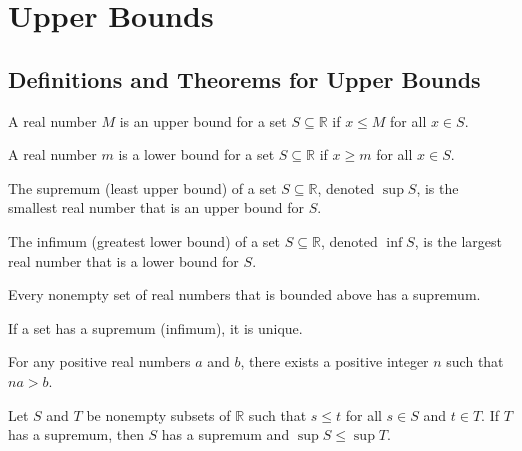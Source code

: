 \section{Upper Bounds}

\subsection*{Definitions and Theorems for Upper Bounds}

\begin{definition}
A real number $M$ is an upper bound for a set $S \subseteq \mathbb{R}$ if $x \leq M$ for all $x \in S$.
\end{definition}

\begin{definition}
A real number $m$ is a lower bound for a set $S \subseteq \mathbb{R}$ if $x \geq m$ for all $x \in S$.
\end{definition}

\begin{definition}[Supremum]
The supremum (least upper bound) of a set $S \subseteq \mathbb{R}$, denoted $\sup S$, is the smallest real number that is an upper bound for $S$.
\end{definition}

\begin{definition}[Infimum]
The infimum (greatest lower bound) of a set $S \subseteq \mathbb{R}$, denoted $\inf S$, is the largest real number that is a lower bound for $S$.
\end{definition}

\begin{theorem}
Every nonempty set of real numbers that is bounded above has a supremum.
\end{theorem}

\begin{theorem}
If a set has a supremum (infimum), it is unique.
\end{theorem}

\begin{theorem}
For any positive real numbers $a$ and $b$, there exists a positive integer $n$ such that $na > b$.
\end{theorem}

\begin{theorem}
Let $S$ and $T$ be nonempty subsets of $\mathbb{R}$ such that $s \leq t$ for all $s \in S$ and $t \in T$. If $T$ has a supremum, then $S$ has a supremum and $\sup S \leq \sup T$.
\end{theorem}





